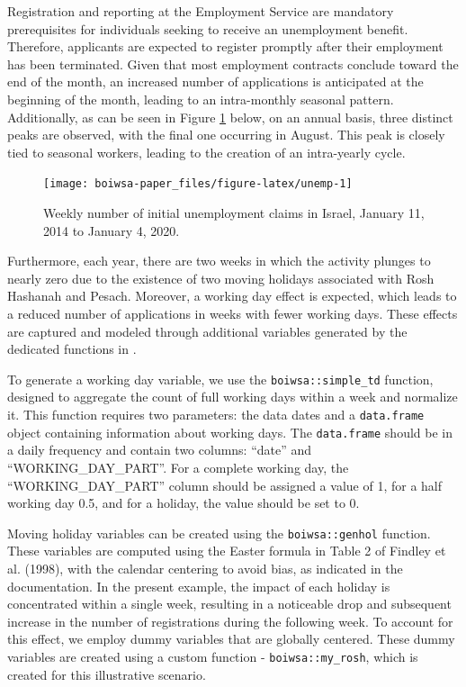 Registration and reporting at the Employment Service are mandatory prerequisites for individuals seeking to receive an unemployment benefit. Therefore, applicants are expected to register promptly after their employment has been terminated. Given that most employment contracts conclude toward the end of the month, an increased number of applications is anticipated at the beginning of the month, leading to an intra-monthly seasonal pattern. Additionally, as can be seen in Figure \ref{fig:unemp} below, on an annual basis, three distinct peaks are observed, with the final one occurring in August. This peak is closely tied to seasonal workers, leading to the creation of an intra-yearly cycle.

\begin{figure}[H]

{\centering \texttt{[image: boiwsa-paper\_files/figure-latex/unemp-1]} 

}

\caption{Weekly number of initial unemployment claims in Israel, January 11, 2014 to January 4, 2020.}\label{fig:unemp}
\end{figure}

Furthermore, each year, there are two weeks in which the activity plunges to nearly zero due to the existence of two moving holidays associated with Rosh Hashanah and Pesach. Moreover, a working day effect is expected, which leads to a reduced number of applications in weeks with fewer working days. These effects are captured and modeled through additional variables generated by the dedicated functions in .

To generate a working day variable, we use the \texttt{boiwsa::simple\_td} function, designed to aggregate the count of full working days within a week and normalize it. This function requires two parameters: the data dates and a \texttt{data.frame} object containing information about working days. The \texttt{data.frame} should be in a daily frequency and contain two columns: ``date'' and ``WORKING\_DAY\_PART''. For a complete working day, the ``WORKING\_DAY\_PART'' column should be assigned a value of 1, for a half working day 0.5, and for a holiday, the value should be set to 0.

Moving holiday variables can be created using the \texttt{boiwsa::genhol} function. These variables are computed using the Easter formula in Table 2 of Findley et al. (1998), with the calendar centering to avoid bias, as indicated in the documentation. In the present example, the impact of each holiday is concentrated within a single week, resulting in a noticeable drop and subsequent increase in the number of registrations during the following week. To account for this effect, we employ dummy variables that are globally centered. These dummy variables are created using a custom function - \texttt{boiwsa::my\_rosh}, which is created for this illustrative scenario.

